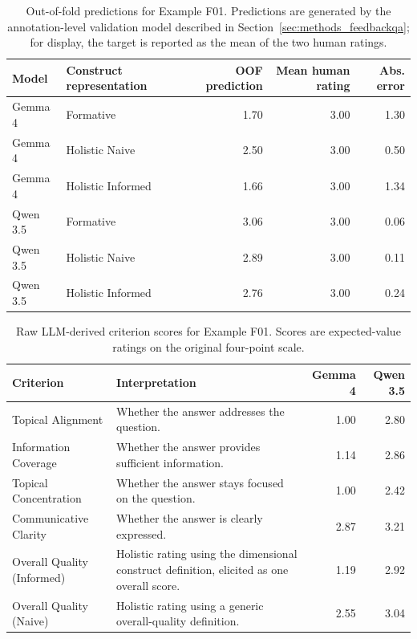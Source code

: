\begin{table}[h]
\centering
\small
\caption{Out-of-fold predictions for Example F01. Predictions are generated by
the annotation-level validation model described in Section~\ref{sec:methods_feedbackqa};
for display, the target is reported as the mean of the two human ratings.}
\label{tab:feedbackqa_example_f01_oof}
\begin{tabularx}{\textwidth}{@{}l l r r r@{}}
\toprule
\textbf{Model} & \textbf{Construct representation} & \textbf{OOF prediction} & \textbf{Mean human rating} & \textbf{Abs. error} \\
\midrule
Gemma 4 & Formative & 1.70 & 3.00 & 1.30 \\
Gemma 4 & Holistic Naive & 2.50 & 3.00 & 0.50 \\
Gemma 4 & Holistic Informed & 1.66 & 3.00 & 1.34 \\
\addlinespace
Qwen 3.5 & Formative & 3.06 & 3.00 & 0.06 \\
Qwen 3.5 & Holistic Naive & 2.89 & 3.00 & 0.11 \\
Qwen 3.5 & Holistic Informed & 2.76 & 3.00 & 0.24 \\
\bottomrule
\end{tabularx}
\end{table}

\begin{table}[h]
\centering
\small
\caption{Raw LLM-derived criterion scores for Example F01. Scores are expected-value ratings on the original four-point scale.}
\label{tab:feedbackqa_example_f01_scores}
\begin{tabularx}{\textwidth}{@{}l X r r@{}}
\toprule
\textbf{Criterion} & \textbf{Interpretation} & \textbf{Gemma 4} & \textbf{Qwen 3.5} \\
\midrule
Topical Alignment & Whether the answer addresses the question. & 1.00 & 2.80 \\
Information Coverage & Whether the answer provides sufficient information. & 1.14 & 2.86 \\
Topical Concentration & Whether the answer stays focused on the question. & 1.00 & 2.42 \\
Communicative Clarity & Whether the answer is clearly expressed. & 2.87 & 3.21 \\
\addlinespace
Overall Quality (Informed) & Holistic rating using the dimensional construct definition, elicited as one overall score. & 1.19 & 2.92 \\
Overall Quality (Naive) & Holistic rating using a generic overall-quality definition. & 2.55 & 3.04 \\
\bottomrule
\end{tabularx}
\end{table}


